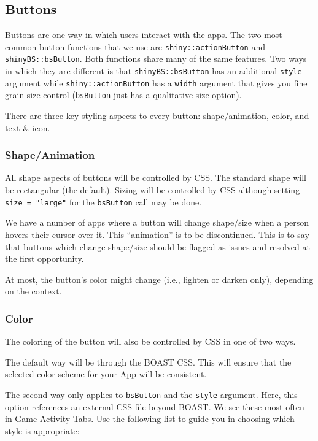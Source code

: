 \documentclass[
]{book}
\begin{document}
\hypertarget{buttons}{%
\subsection{Buttons}\label{buttons}}

Buttons are one way in which users interact with the apps. The two most common button functions that we use are \texttt{shiny::actionButton} and \texttt{shinyBS::bsButton}. Both functions share many of the same features. Two ways in which they are different is that \texttt{shinyBS::bsButton} has an additional \texttt{style} argument while \texttt{shiny::actionButton} has a \texttt{width} argument that gives you fine grain size control (\texttt{bsButton} just has a qualitative size option).

There are three key styling aspects to every button: shape/animation, color, and text \& icon.

\hypertarget{shapeanimation}{%
\subsubsection{Shape/Animation}\label{shapeanimation}}

All shape aspects of buttons will be controlled by CSS. The standard shape will be rectangular (the default). Sizing will be controlled by CSS although setting \texttt{size\ =\ "large"} for the \texttt{bsButton} call may be done.

We have a number of apps where a button will change shape/size when a person hovers their cursor over it. This ``animation'' is to be discontinued. This is to say that buttons which change shape/size should be flagged as issues and resolved at the first opportunity.

At most, the button's color might change (i.e., lighten or darken only), depending on the context.

\hypertarget{color}{%
\subsubsection{Color}\label{color}}

The coloring of the button will also be controlled by CSS in one of two ways.

The default way will be through the BOAST CSS. This will ensure that the selected color scheme for your App will be consistent.

The second way only applies to \texttt{bsButton} and the \texttt{style} argument. Here, this option references an external CSS file beyond BOAST. We see these most often in Game Activity Tabs. Use the following list to guide you in choosing which style is appropriate:
\end{document}
